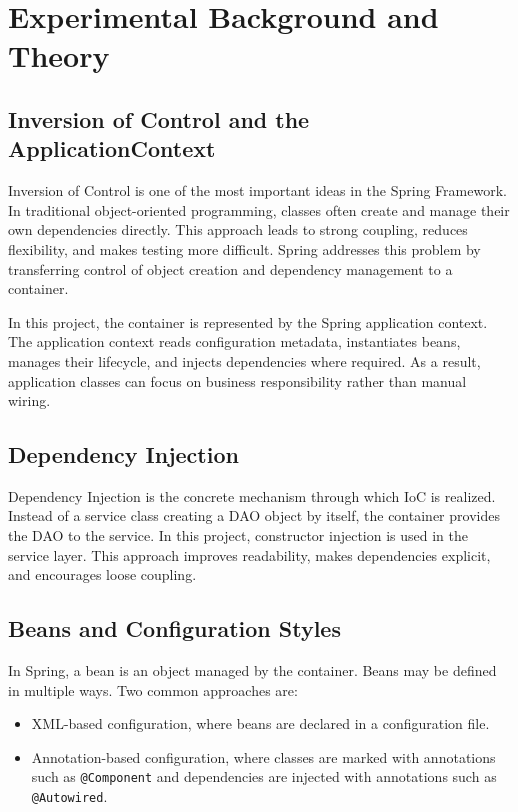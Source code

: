 \documentclass[12pt,a4paper]{article}
\begin{document}
\section{Experimental Background and Theory}

\subsection{Inversion of Control and the ApplicationContext}
Inversion of Control is one of the most important ideas in the Spring Framework. In traditional object-oriented programming, classes often create and manage their own dependencies directly. This approach leads to strong coupling, reduces flexibility, and makes testing more difficult. Spring addresses this problem by transferring control of object creation and dependency management to a container.

In this project, the container is represented by the Spring application context. The application context reads configuration metadata, instantiates beans, manages their lifecycle, and injects dependencies where required. As a result, application classes can focus on business responsibility rather than manual wiring.

\subsection{Dependency Injection}
Dependency Injection is the concrete mechanism through which IoC is realized. Instead of a service class creating a DAO object by itself, the container provides the DAO to the service. In this project, constructor injection is used in the service layer. This approach improves readability, makes dependencies explicit, and encourages loose coupling.

\subsection{Beans and Configuration Styles}
In Spring, a bean is an object managed by the container. Beans may be defined in multiple ways. Two common approaches are:
\begin{itemize}
    \item XML-based configuration, where beans are declared in a configuration file.
    \item Annotation-based configuration, where classes are marked with annotations such as \texttt{@Component} and dependencies are injected with annotations such as \texttt{@Autowired}.
\end{itemize}
\end{document}
